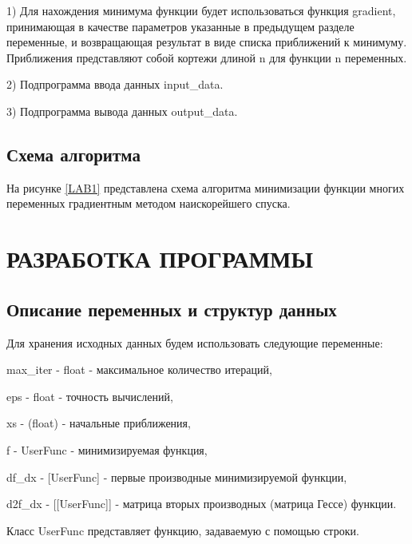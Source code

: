 1) Для нахождения минимума функции будет использоваться функция gradient, принимающая в качестве параметров указанные в предыдущем разделе переменные, и возвращающая результат в виде списка приближений к минимуму. Приближения представляют собой кортежи длиной n для функции n переменных.

2) Подпрограмма ввода данных input\_data.

3) Подпрограмма вывода данных output\_data.

\subsection{Схема алгоритма}
На рисунке \ref{LAB1} представлена схема алгоритма минимизации функции многих переменных градиентным методом наискорейшего спуска.
\section{РАЗРАБОТКА ПРОГРАММЫ}
\subsection{Описание переменных и структур данных}
Для хранения исходных данных будем использовать следующие переменные:

max\_iter - float - максимальное количество итераций,

eps - float - точность вычислений,

xs - (float) - начальные приближения,

f - UserFunc - минимизируемая функция,

df\_dx - [UserFunc] - первые производные минимизируемой функции,

d2f\_dx - [[UserFunc]] - матрица вторых производных (матрица Гессе) функции.

Класс UserFunc представляет функцию, задаваемую с помощью строки.

